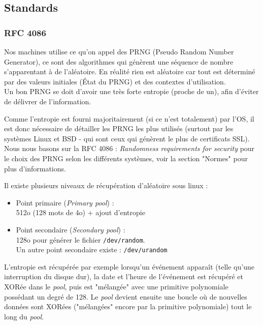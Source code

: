 \subsection{Standards}
	\subsubsection{RFC 4086}

			Nos machines utilise ce qu'on appel des PRNG (Pseudo Random Number
			Generator), ce sont des algorithmes qui génèrent une 
			séquence de nombre s'apparentant à de l'aléatoire.
			En réalité rien est aléatoire car tout est déterminé par
			des valeurs initiales (État du PRNG) et des contextes 
			d'utilisation.\\
			
			Un bon PRNG se doit d'avoir une très forte entropie (proche de un),
			afin d'éviter de délivrer de l'information.
		
			Comme l'entropie est fourni majoritairement (si ce n'est totalement)
			par l'OS, il est donc nécessaire de détailler les PRNG les plus
			utilisés (surtout par les systèmes Linux et BSD - qui sont 
			ceux qui génèrent le plus de certificats SSL).\\
		
			Nous nous basons sur la RFC 4086 \cite{rfc4086}: 
			\textit{Randomness requirements for security}
			pour le choix des PRNG selon les différents	systèmes, voir
			la section "Normes" pour plus d'informations.	
	
		
			Il existe plusieurs niveaux de récupération d'aléatoire sous linux  :\\
			\begin{itemize}
			\item Point primaire (\textit{Primary pool}) :\\
			512o (128 mots de 4o) + ajout d’entropie\\
			\item Point secondaire (\textit{Secondary pool}) :\\
			128o pour générer le fichier \texttt{/dev/random}. \\
			Un autre point secondaire existe : \texttt{/dev/urandom}\\
			\end{itemize}
			
			L'entropie est récupérée par exemple lorsqu'un événement apparaît 
			(telle qu'une interruption du disque dur), la date et l'heure de 
			l'événement est récupéré et XORée dans le \textit{pool}, puis est 
			"mélangée" avec une primitive polynomiale possédant un degré de 128. 
			Le \textit{pool} devient ensuite une boucle où de nouvelles données 
			sont XORées ("mélangées" encore par la primitive polynomiale) tout 
			le long du \textit{pool}.\\
			
